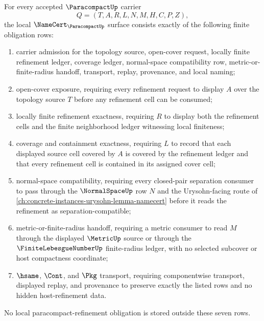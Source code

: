 \begin{theorem}
\label{thm:paracompact-namecert-obligations}
For every accepted $\ParacompactUp$ carrier
$$
Q=(T,A,R,L,N,M,H,C,P,Z),
$$
the local $\NameCert_{\ParacompactUp}$ surface consists exactly of the following finite obligation rows:
\begin{enumerate}
\item carrier admission for the topology source, open-cover request, locally finite refinement ledger, coverage ledger, normal-space compatibility row, metric-or-finite-radius handoff, transport, replay, provenance, and local naming;
\item open-cover exposure, requiring every refinement request to display $A$ over the topology source $T$ before any refinement cell can be consumed;
\item locally finite refinement exactness, requiring $R$ to display both the refinement cells and the finite neighborhood ledger witnessing local finiteness;
\item coverage and containment exactness, requiring $L$ to record that each displayed source cell covered by $A$ is covered by the refinement ledger and that every refinement cell is contained in its assigned cover cell;
\item normal-space compatibility, requiring every closed-pair separation consumer to pass through the $\NormalSpaceUp$ row $N$ and the Urysohn-facing route of \autoref{ch:concrete-instances-urysohn-lemma-namecert} before it reads the refinement as separation-compatible;
\item metric-or-finite-radius handoff, requiring a metric consumer to read $M$ through the displayed $\MetricUp$ source or through the $\FiniteLebesgueNumberUp$ finite-radius ledger, with no selected subcover or host compactness coordinate;
\item $\hsame$, $\Cont$, and $\Pkg$ transport, requiring componentwise transport, displayed replay, and provenance to preserve exactly the listed rows and no hidden host-refinement data.
\end{enumerate}
No local paracompact-refinement obligation is stored outside these seven rows.
\end{theorem}
